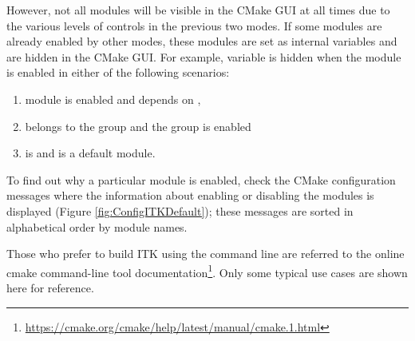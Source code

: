 However, not all modules will be visible in the CMake GUI at all times due to
the various levels of controls in the previous two modes. If some modules are
already enabled by other modes, these modules are set as internal variables and
are hidden in the CMake GUI. For example,  variable is
hidden when the module  is enabled in either of the following
scenarios:
\begin{enumerate}
\item module  is enabled and depends on ,
\item {} belongs to the group  and the
group is enabled
\item {} is  and  is a
default module.
\end{enumerate}

To find out why a particular module is enabled, check the CMake configuration
messages where the information about enabling or disabling the modules is
displayed (Figure \ref{fig:ConfigITKDefault}); these messages are sorted in
alphabetical order by module names.

Those who prefer to build ITK using the command line are referred to the online
cmake command-line tool
documentation\footnote{\url{https://cmake.org/cmake/help/latest/manual/cmake.1.html}}.
Only some typical use cases are shown here for reference.

